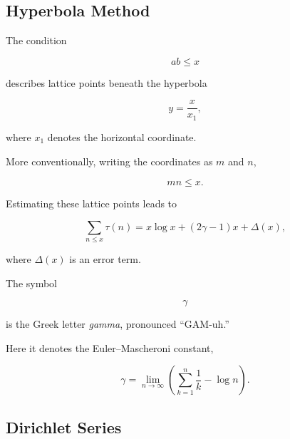 \subsection{Hyperbola Method}
\label{subsec:hyperbola-method}

The condition

\[ ab\leq x \]

describes lattice points beneath the hyperbola

\[ y=\frac{x}{x_1}, \]

where \(x_1\) denotes the horizontal coordinate.

More conventionally, writing the coordinates as \(m\) and \(n\),

\[ mn\leq x. \]

\begin{centereddiagram}
\end{centereddiagram}

Estimating these lattice points leads to

\[ \sum_{n\leq x}\tau(n)=x\log x+(2\gamma-1)x+\Delta(x), \]

where \(\Delta(x)\) is an error term.

The symbol

\[ \gamma \]

is the Greek letter \emph{gamma}, pronounced ``GAM-uh.''

Here it denotes the Euler--Mascheroni constant,

\[ \gamma=\lim_{n\to\infty}\left(\sum_{k=1}^{n}\frac1k-\log n\right). \]

\subsection{Dirichlet Series}
\label{subsec:dirichlet-series}

